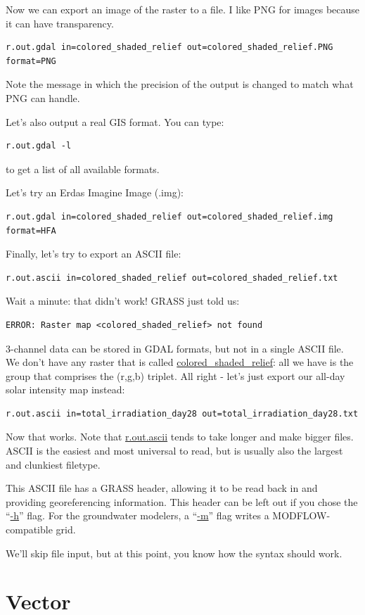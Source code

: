 \documentclass{book}
\begin{document}
Now we can export an image of the raster to a file. I like PNG for images because it can have transparency.

\begin{lstlisting}
r.out.gdal in=colored_shaded_relief out=colored_shaded_relief.PNG format=PNG
\end{lstlisting}
Note the message in which the precision of the output is changed to match what PNG can handle.

Let's also output a real GIS format. You can type:
\begin{lstlisting}
r.out.gdal -l
\end{lstlisting}
to get a list of all available formats.

Let's try an Erdas Imagine Image (.img):
\begin{lstlisting}
r.out.gdal in=colored_shaded_relief out=colored_shaded_relief.img format=HFA
\end{lstlisting}

Finally, let's try to export an ASCII file:
\begin{lstlisting}
r.out.ascii in=colored_shaded_relief out=colored_shaded_relief.txt
\end{lstlisting}
Wait a minute: that didn't work! GRASS just told us:
\begin{lstlisting}
ERROR: Raster map <colored_shaded_relief> not found
\end{lstlisting}
3-channel data can be stored in GDAL formats, but not in a single ASCII file. We don't have any raster that is called \url{colored_shaded_relief}: all we have is the group that comprises the (r,g,b) triplet. All right - let's just export our all-day solar intensity map instead:
\begin{lstlisting}
r.out.ascii in=total_irradiation_day28 out=total_irradiation_day28.txt
\end{lstlisting}
Now that works. Note that \url{r.out.ascii} tends to take longer and make bigger files. ASCII is the easiest and most universal to read, but is usually also the largest and clunkiest filetype.

This ASCII file has a GRASS header, allowing it to be read back in and providing georeferencing information. This header can be left out if you chose the ``\url{-h}'' flag. For the groundwater modelers, a ``\url{-m}'' flag writes a MODFLOW-compatible grid.

We'll skip file input, but at this point, you know how the syntax should work.

\section{Vector}
\end{document}
